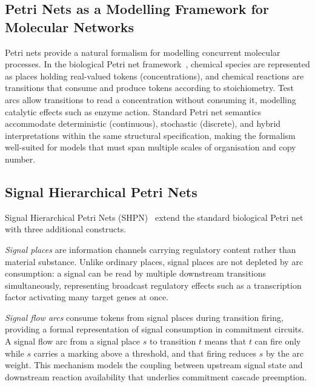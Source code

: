 
\subsection{Petri Nets as a Modelling Framework for Molecular Networks}

Petri nets provide a natural formalism for modelling concurrent molecular
processes. In the biological Petri net framework~\cite{heiner2008}, chemical
species are represented as places holding real-valued tokens (concentrations),
and chemical reactions are transitions that consume and produce tokens according
to stoichiometry. Test arcs allow transitions to read a concentration without
consuming it, modelling catalytic effects such as enzyme action. Standard Petri
net semantics accommodate deterministic (continuous), stochastic (discrete), and
hybrid interpretations within the same structural specification, making the
formalism well-suited for models that must span multiple scales of organisation
and copy number.

\subsection{Signal Hierarchical Petri Nets}
\label{sec:shpn_def}

Signal Hierarchical Petri Nets (SHPN)~\cite{shypn2026} extend the standard
biological Petri net with three additional constructs.

\emph{Signal places} are information channels carrying regulatory content rather
than material substance. Unlike ordinary places, signal places are not depleted
by arc consumption: a signal can be read by multiple downstream transitions
simultaneously, representing broadcast regulatory effects such as a transcription
factor activating many target genes at once.

\emph{Signal flow arcs} consume tokens from signal places during transition
firing, providing a formal representation of signal consumption in commitment
circuits. A signal flow arc from a signal place $s$ to transition $t$ means that
$t$ can fire only while $s$ carries a marking above a threshold, and that firing
reduces $s$ by the arc weight. This mechanism models the coupling between
upstream signal state and downstream reaction availability that underlies
commitment cascade preemption.


